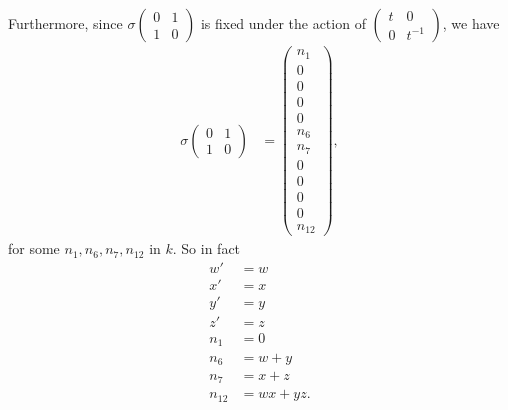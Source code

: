 Furthermore, since $\sigma\left(\begin{matrix} 0 & 1 \\ 1 & 0\end{matrix}\right)$ is fixed under the action of $\left(\begin{matrix} t & 0 \\ 0 & t^{-1}\end{matrix}\right)$, we have
\begin{align*}
\sigma\left(\begin{matrix} 0 & 1 \\ 1 & 0\end{matrix}\right) &=
\left(\begin{matrix}
n_1 \\
0 \\
0 \\
0 \\
0 \\
n_6 \\
n_7 \\
0 \\
0 \\
0 \\
0 \\
n_{12}
\end{matrix}\right),
\end{align*} 
for some $n_1, n_6, n_7, n_{12}$ in $k$. So in fact
\begin{align*}
w' &= w \\
x' &= x \\
y' &= y \\
z' &= z \\
n_1 &= 0\\
n_6 &=w+y\\
n_7 &= x+z\\
n_{12} &= wx + yz.
\end{align*}

